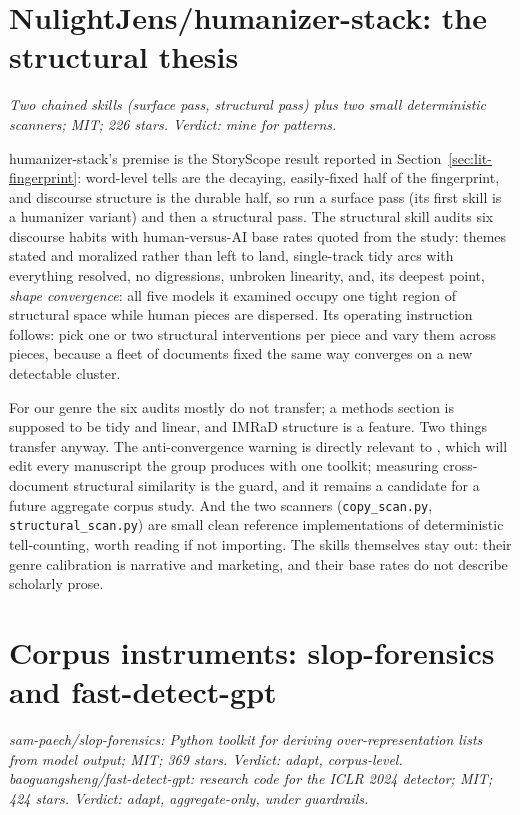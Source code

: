 \section{NulightJens/humanizer-stack: the structural thesis}
\label{sec:oss-stack}

\emph{Two chained skills (surface pass, structural pass) plus two small
deterministic scanners; MIT; 226 stars. Verdict: mine for patterns.}

humanizer-stack's premise is the StoryScope result reported in
Section~\ref{sec:lit-fingerprint}: word-level tells are the decaying,
easily-fixed half of the fingerprint, and discourse structure is the
durable half, so run a surface pass (its first skill is a humanizer
variant) and then a structural pass. The structural skill audits six
discourse habits with human-versus-AI base rates quoted from the study:
themes stated and moralized rather than left to land, single-track tidy
arcs with everything resolved, no digressions, unbroken linearity, and,
its deepest point, \emph{shape convergence}: all five models it examined
occupy one tight region of structural space while human pieces are
dispersed. Its operating instruction follows: pick one or two structural
interventions per piece and vary them across pieces, because a fleet of
documents fixed the same way converges on a new detectable cluster.

For our genre the six audits mostly do not transfer; a methods section is
supposed to be tidy and linear, and IMRaD structure is a feature. Two
things transfer anyway. The anti-convergence warning is directly relevant
to \hv{}, which will edit every manuscript the group produces with one
toolkit; measuring cross-document structural similarity is the guard, and
it remains a candidate for a future aggregate corpus study. And the two scanners
(\texttt{copy\_scan.py}, \texttt{structural\_scan.py}) are small clean
reference implementations of deterministic tell-counting, worth reading if
not importing. The skills themselves stay out: their genre calibration is
narrative and marketing, and their base rates do not describe scholarly
prose.

\section{Corpus instruments: slop-forensics and fast-detect-gpt}
\label{sec:oss-corpus}

\emph{sam-paech/slop-forensics: Python toolkit for deriving
over-representation lists from model output; MIT; 369 stars. Verdict:
adapt, corpus-level. baoguangsheng/fast-detect-gpt: research code for the
ICLR 2024 detector; MIT; 424 stars. Verdict: adapt, aggregate-only, under
guardrails.}

